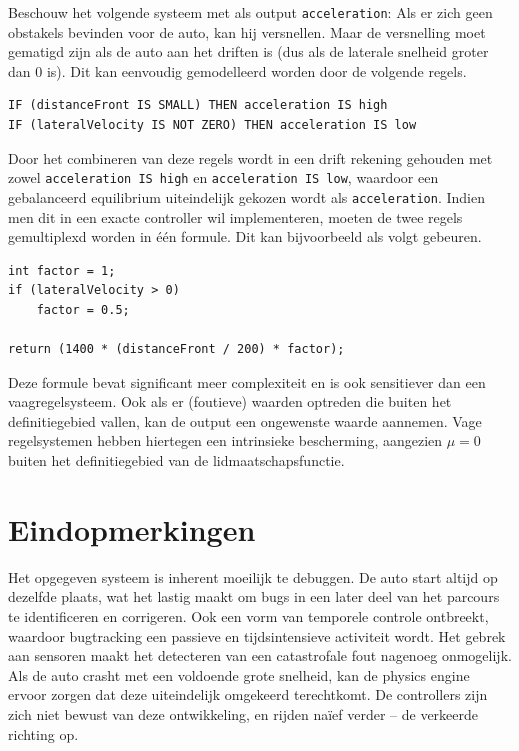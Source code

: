 \documentclass[10pt,a4paper]{article}
\begin{document}
			Beschouw het volgende systeem met als output \texttt{acceleration}: Als er zich geen obstakels bevinden voor de auto, kan hij versnellen. Maar de versnelling moet gematigd zijn als de auto aan het driften is (dus als de laterale snelheid groter dan 0 is).
			Dit kan eenvoudig gemodelleerd worden door de volgende regels.

			\begin{lstlisting}
IF (distanceFront IS SMALL) THEN acceleration IS high
IF (lateralVelocity IS NOT ZERO) THEN acceleration IS low
			\end{lstlisting}

			Door het combineren van deze regels wordt in een drift rekening gehouden met zowel \texttt{acceleration IS high} en \texttt{acceleration IS low}, waardoor een gebalanceerd equilibrium uiteindelijk gekozen wordt als \texttt{acceleration}.
			Indien men dit in een exacte controller wil implementeren, moeten de twee regels gemultiplexd worden in \'e\'en formule. Dit kan bijvoorbeeld als volgt gebeuren.

			\begin{lstlisting}
int factor = 1;
if (lateralVelocity > 0)
	factor = 0.5;

return (1400 * (distanceFront / 200) * factor);
			\end{lstlisting}

			Deze formule bevat significant meer complexiteit en is ook sensitiever dan een vaagregelsysteem. Ook als er (foutieve) waarden optreden die buiten het definitiegebied vallen, kan de output een ongewenste waarde aannemen. Vage regelsystemen hebben hiertegen een intrinsieke bescherming, aangezien $\mu = 0$ buiten het definitiegebied van de lidmaatschapsfunctie.

		\section*{Eindopmerkingen}
			Het opgegeven systeem is inherent moeilijk te debuggen. De auto start altijd op dezelfde plaats, wat het lastig maakt om bugs in een later deel van het parcours te identificeren en corrigeren. Ook een vorm van temporele controle ontbreekt, waardoor bugtracking een passieve en tijdsintensieve activiteit wordt. Het gebrek aan sensoren maakt het detecteren van een catastrofale fout nagenoeg onmogelijk. Als de auto crasht met een voldoende grote snelheid, kan de physics engine ervoor zorgen dat deze uiteindelijk omgekeerd terechtkomt. De controllers zijn zich niet bewust van deze ontwikkeling, en rijden na\"ief verder -- de verkeerde richting op.\\
\end{document}
